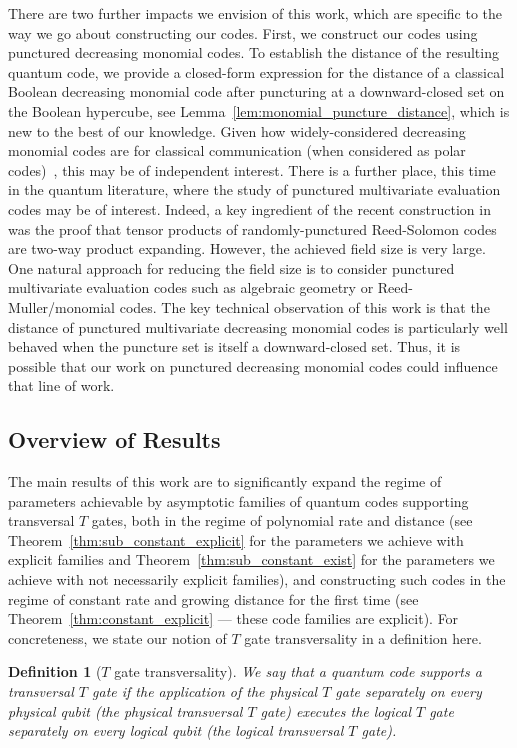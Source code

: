 \documentclass{article}
\newcounter{main}[section]
\newtheorem{definition}[main]{Definition}
\begin{document}
There are two further impacts we envision of this work, which are specific to the way we go about constructing our codes. First, we construct our codes using punctured decreasing monomial codes. To establish the distance of the resulting quantum code, we provide a closed-form expression for the distance of a classical Boolean decreasing monomial code after puncturing at a downward-closed set on the Boolean hypercube, see Lemma~\ref{lem:monomial_puncture_distance}, which is new to the best of our knowledge. Given how widely-considered decreasing monomial codes are for classical communication (when considered as polar codes)~\cite{arikan2009channel,bardet2016algebraic,bioglio2020design}, this may be of independent interest. There is a further place, this time in the quantum literature, where the study of punctured multivariate evaluation codes may be of interest. Indeed, a key ingredient of the recent construction in~\cite{li2026transversal} was the proof that tensor products of randomly-punctured Reed-Solomon codes are two-way product expanding. However, the achieved field size is very large. One natural approach for reducing the field size is to consider punctured multivariate evaluation codes such as algebraic geometry or Reed-Muller/monomial codes. The key technical observation of this work is that the distance of punctured multivariate decreasing monomial codes is particularly well behaved when the puncture set is itself a downward-closed set. Thus, it is possible that our work on punctured decreasing monomial codes could influence that line of work.

\subsection{Overview of Results}

The main results of this work are to significantly expand the regime of parameters achievable by asymptotic families of quantum codes supporting transversal $T$ gates, both in the regime of polynomial rate and distance (see Theorem~\ref{thm:sub_constant_explicit} for the parameters we achieve with explicit families and Theorem~\ref{thm:sub_constant_exist} for the parameters we achieve with not necessarily explicit families), and constructing such codes in the regime of constant rate and growing distance for the first time (see Theorem~\ref{thm:constant_explicit} --- these code families are explicit). For concreteness, we state our notion of $T$ gate transversality in a definition here.
\begin{definition}[$T$ gate transversality]\label{def:T_gate_transversality}
    We say that a quantum code supports a transversal $T$ gate if the application of the physical $T$ gate separately on every physical qubit (the physical transversal $T$ gate) executes the logical $T$ gate separately on every logical qubit (the logical transversal $T$ gate).
\end{definition}
\end{document}
